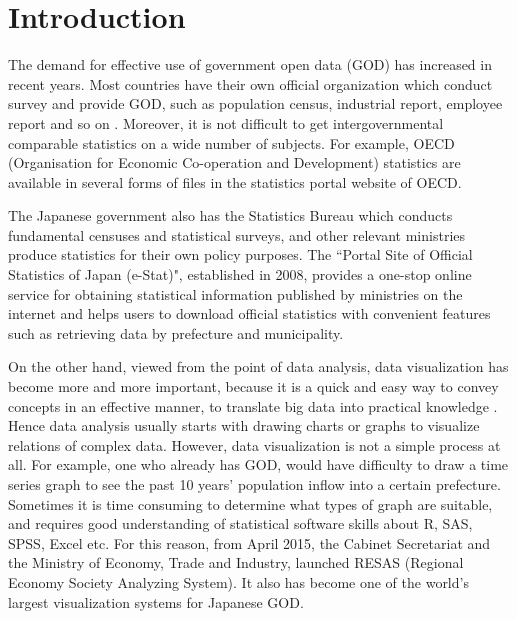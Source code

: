 \documentclass[10pt, conference, compsocconf]{IEEEtran}
\begin{document}
%
\IEEEpeerreviewmaketitle




\section{Introduction}

The demand for effective use of government open data (GOD) has increased in recent years.
Most countries have their own official organization which conduct survey and provide GOD, such as population census, industrial report, employee report and so on \cite{climate,god1, uscensus}.
Moreover, it is not difficult to get intergovernmental comparable statistics on a wide number of subjects. For example, OECD (Organisation for Economic Co-operation and Development) statistics are available in several forms of files in the statistics portal website of OECD\cite{oecd}. 


The Japanese government also has the Statistics Bureau which
conducts fundamental censuses and statistical surveys, and other relevant ministries produce statistics for their own policy purposes. 
The ``Portal Site of Official Statistics of Japan (e-Stat)", established in 2008, provides a one-stop online service for obtaining statistical information published by ministries on the internet and helps users to download official statistics with convenient features such as retrieving data by prefecture and municipality\cite{jpcensus, estat}.

On the other hand, viewed from the point of data analysis, data visualization has become more and more important,
because it is a quick and easy way to convey concepts in an effective manner, to translate big data into practical knowledge \cite{bigdata,bigdata1, bigdata3, bigdata4, visual, visual1}. 
Hence data analysis usually starts with drawing charts or graphs to visualize relations of complex data. 
However, data visualization is not a simple process at all. 
For example, one who already has GOD, would have difficulty to draw a time series graph to see the past 10 years' population inflow into a certain prefecture. Sometimes it is time consuming to determine what types of graph are suitable, 
and requires good understanding of statistical software skills about R, SAS, SPSS, Excel etc.
For this reason, from April 2015, 
the Cabinet Secretariat and the Ministry of Economy, Trade and Industry,  
launched RESAS (Regional Economy Society Analyzing System). It also has become one of the world's largest visualization systems for Japanese GOD.
\end{document}

